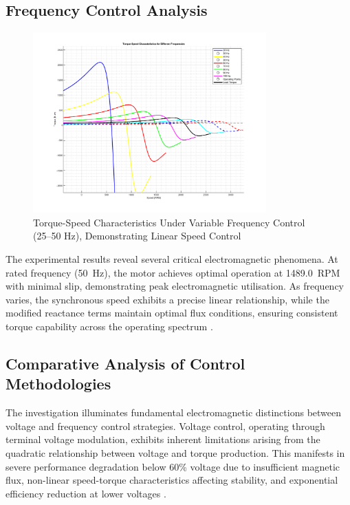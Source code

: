 \documentclass[a4paper,12pt]{IEEEtran}
\begin{document}
\subsection{Frequency Control Analysis}
\begin{figure}[htbp]
    \centering
    \includegraphics[width=0.8\textwidth]{speed.png}
    \caption{Torque-Speed Characteristics Under Variable Frequency Control (25--50 Hz), Demonstrating Linear Speed Control}
    \label{fig:frequency_control}
\end{figure}

The experimental results reveal several critical electromagnetic phenomena. At rated frequency (50~Hz), the motor achieves optimal operation at 1489.0~RPM with minimal slip, demonstrating peak electromagnetic utilisation. As frequency varies, the synchronous speed exhibits a precise linear relationship, while the modified reactance terms maintain optimal flux conditions, ensuring consistent torque capability across the operating spectrum \cite{Boldea2014}.

\subsection*{Comparative Analysis of Control Methodologies}

The investigation illuminates fundamental electromagnetic distinctions between voltage and frequency control strategies. Voltage control, operating through terminal voltage modulation, exhibits inherent limitations arising from the quadratic relationship between voltage and torque production. This manifests in severe performance degradation below 60\% voltage due to insufficient magnetic flux, non-linear speed-torque characteristics affecting stability, and exponential efficiency reduction at lower voltages \cite{fitzgerald2020}.
\end{document}
